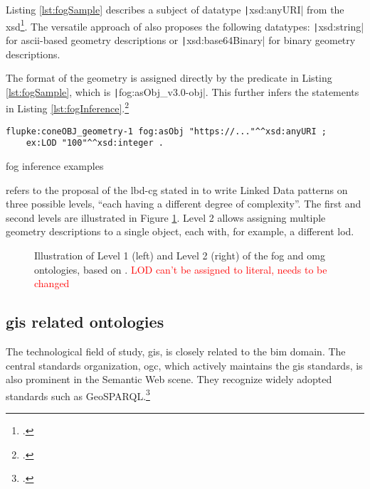 Listing \ref{lst:fogSample} describes a subject of datatype \texttt|xsd:anyURI| from the \ac{xsd}\footcites{xsd}. The versatile approach of \cite{Bonduel2019} also proposes the following datatypes: \texttt|xsd:string| for \ac{ascii}-based geometry descriptions or \texttt|xsd:base64Binary| for binary geometry descriptions.

The format of the geometry is assigned directly by the predicate in Listing \ref{lst:fogSample}, which is \texttt|fog:asObj_v3.0-obj|. This further infers the statements in Listing \ref{lst:fogInference}.\footcite{fog}

\begin{listing}[H]
    \begin{verbatim}
flupke:coneOBJ_geometry-1 fog:asObj "https://..."^^xsd:anyURI ;
    ex:LOD "100"^^xsd:integer .
    \end{verbatim}
    \vspace{-0.7cm}
    \caption{\acs{fog} inference examples}
    \label{lst:fogInference}
\end{listing}

\cite{Bonduel2019} refers to the proposal of the \ac{lbd-cg} stated in \cite{holten2018opm} to write Linked Data patterns on three possible levels, \enquote{each having a different degree of complexity}. The first and second levels are illustrated in Figure \ref{fig:fogGom}. Level 2 allows assigning multiple geometry descriptions to a single object, each with, for example, a different \ac{lod}.

\begin{figure}[H]
    \begin{adjustwidth}{-0.8cm}{-0.8cm}
        \centering
        \ttfamily
        
        \vspace{-0.3cm}
        \caption[Illustration of the \acs{fog} and \acs{omg} ontologies]{Illustration of Level 1 (left) and Level 2 (right) of the \acs{fog} and \acs{omg} ontologies, based on \cite{Bonduel2019}. \textcolor{red}{LOD can't be assigned to literal, needs to be changed}}
        \label{fig:fogGom}
    \end{adjustwidth}
\end{figure}

\subsection{\acs{gis} related ontologies}
The technological field of study, \acf{gis}, is closely related to the \ac{bim} domain. The central standards organization, \ac{ogc}, which actively maintains the \ac{gis} standards, is also prominent in the Semantic Web scene. They recognize widely adopted standards such as GeoSPARQL.\footcite{OGC2023SW}


